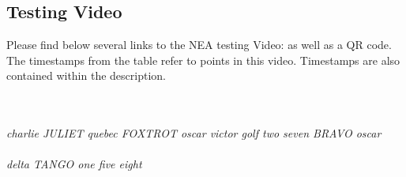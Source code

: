 \begin{flushleft}
    \pagebreak
    \subsection{Testing Video}
        Please find below several links to the NEA testing Video: as well as a QR code. The timestamps from the table refer to points in this video. Timestamps are also contained within the description. \\ \bk
        
        \begin{center}
            \quad
            \\ \BK
            \large
             \\            
            \normalsizeer
            \textit{charlie JULIET quebec FOXTROT oscar victor golf two seven BRAVO oscar} \\ \bk  
            \large
             \\
            \normalsizeer
            \textit{delta TANGO one five eight}
        \end{center}        
\end{flushleft}